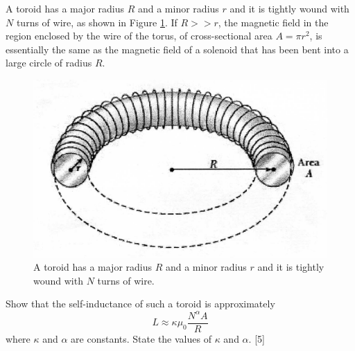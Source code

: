\begin{problem}
    \begin{subproblem}
        A toroid has a major radius $R$ and a minor radius $r$ and it is tightly wound with $N$ turns of wire, as shown in Figure \ref{2010q9}. If $R>>r$, the magnetic field in the region enclosed by the wire of the torus, of cross-sectional area $A=\pi r^{2}$, is essentially the same as the magnetic field of a solenoid that has been bent into a large circle of radius $R$.\\
        \begin{figure}[H]
            \centering
	        \includegraphics[width=0.8\linewidth]{spho_book_TYS_images/2010q9.png}
	        \caption{A toroid has a major radius $R$ and a minor radius $r$ and it is tightly wound with $N$ turns of wire.} \label{2010q9}
        \end{figure}
        Show that the self-inductance of such a toroid is approximately
        \[L \approx \kappa \mu_{0} \frac{N^{\alpha} A}{R}\]
        where $\kappa$ and $\alpha$ are constants. State the values of $\kappa$ and $\alpha$.
    \hfill{[5]}\end{subproblem}


\end{problem}
